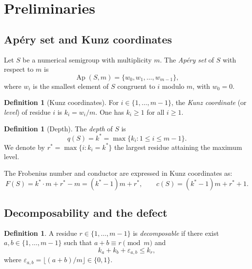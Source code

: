 \documentclass[11pt]{amsart}
\theoremstyle{definition}
\newtheorem{definition}[theorem]{Definition}
\theoremstyle{remark}
\newcommand{\Ap}{\operatorname{Ap}}
\begin{document}
\section{Preliminaries}\label{sec:prelim}

\subsection{Ap\'ery set and Kunz coordinates}

Let $S$ be a numerical semigroup with multiplicity $m$.
The \emph{Ap\'ery set} of $S$ with respect to $m$ is
\[
  \Ap(S, m) = \{w_0, w_1, \ldots, w_{m-1}\},
\]
where $w_i$ is the smallest element of $S$ congruent to $i$ modulo $m$,
with $w_0 = 0$.

\begin{definition}[Kunz coordinates]\label{def:kunz}
For $i \in \{1, \ldots, m-1\}$, the \emph{Kunz coordinate} (or \emph{level})
of residue $i$ is $k_i = w_i / m$.  One has $k_i \ge 1$ for all $i \ge 1$.
\end{definition}

\begin{definition}[Depth]\label{def:depth}
The \emph{depth} of $S$ is
\[
  q(S) = k^* = \max\{k_i : 1 \le i \le m - 1\}.
\]
We denote by $r^* = \max\{i : k_i = k^*\}$ the largest residue attaining the
maximum level.
\end{definition}

The Frobenius number and conductor are expressed in Kunz coordinates as:
\begin{equation}\label{eq:conductor}
  F(S) = k^* \cdot m + r^* - m = (k^* - 1)m + r^*, \qquad
  c(S) = (k^* - 1)m + r^* + 1.
\end{equation}

\subsection{Decomposability and the defect}

\begin{definition}\label{def:decomposable}
A residue $r \in \{1, \ldots, m-1\}$ is \emph{decomposable} if there exist
$a, b \in \{1, \ldots, m-1\}$ such that $a + b \equiv r \pmod{m}$ and
\begin{equation}\label{eq:decomp}
  k_a + k_b + \varepsilon_{a,b} \le k_r,
\end{equation}
where $\varepsilon_{a,b} = \lfloor (a + b)/m \rfloor \in \{0, 1\}$.
\end{definition}
\end{document}
